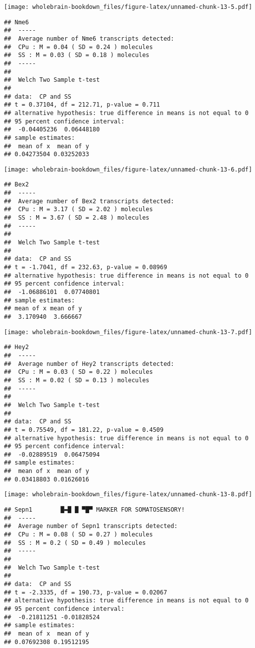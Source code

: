 \documentclass[]{book}
\theoremstyle{definition}
\theoremstyle{definition}
\theoremstyle{remark}
\begin{document}
\texttt{[image: wholebrain-bookdown\_files/figure-latex/unnamed-chunk-13-5.pdf]}

\begin{verbatim}
## Nme6
##  -----
##  Average number of Nme6 transcripts detected:
##  CPu : M = 0.04 ( SD = 0.24 ) molecules 
##  SS : M = 0.03 ( SD = 0.18 ) molecules
##  -----
## 
##  Welch Two Sample t-test
## 
## data:  CP and SS
## t = 0.37104, df = 212.71, p-value = 0.711
## alternative hypothesis: true difference in means is not equal to 0
## 95 percent confidence interval:
##  -0.04405236  0.06448180
## sample estimates:
##  mean of x  mean of y 
## 0.04273504 0.03252033
\end{verbatim}

\texttt{[image: wholebrain-bookdown\_files/figure-latex/unnamed-chunk-13-6.pdf]}

\begin{verbatim}
## Bex2
##  -----
##  Average number of Bex2 transcripts detected:
##  CPu : M = 3.17 ( SD = 2.02 ) molecules 
##  SS : M = 3.67 ( SD = 2.48 ) molecules
##  -----
## 
##  Welch Two Sample t-test
## 
## data:  CP and SS
## t = -1.7041, df = 232.63, p-value = 0.08969
## alternative hypothesis: true difference in means is not equal to 0
## 95 percent confidence interval:
##  -1.06886101  0.07740801
## sample estimates:
## mean of x mean of y 
##  3.170940  3.666667
\end{verbatim}

\texttt{[image: wholebrain-bookdown\_files/figure-latex/unnamed-chunk-13-7.pdf]}

\begin{verbatim}
## Hey2
##  -----
##  Average number of Hey2 transcripts detected:
##  CPu : M = 0.03 ( SD = 0.22 ) molecules 
##  SS : M = 0.02 ( SD = 0.13 ) molecules
##  -----
## 
##  Welch Two Sample t-test
## 
## data:  CP and SS
## t = 0.75549, df = 181.22, p-value = 0.4509
## alternative hypothesis: true difference in means is not equal to 0
## 95 percent confidence interval:
##  -0.02889519  0.06475094
## sample estimates:
##  mean of x  mean of y 
## 0.03418803 0.01626016
\end{verbatim}

\texttt{[image: wholebrain-bookdown\_files/figure-latex/unnamed-chunk-13-8.pdf]}

\begin{verbatim}
## Sepn1        █▬█ █ ▀█▀ MARKER FOR SOMATOSENSORY!
##  -----
##  Average number of Sepn1 transcripts detected:
##  CPu : M = 0.08 ( SD = 0.27 ) molecules 
##  SS : M = 0.2 ( SD = 0.49 ) molecules
##  -----
## 
##  Welch Two Sample t-test
## 
## data:  CP and SS
## t = -2.3335, df = 190.73, p-value = 0.02067
## alternative hypothesis: true difference in means is not equal to 0
## 95 percent confidence interval:
##  -0.21811251 -0.01828524
## sample estimates:
##  mean of x  mean of y 
## 0.07692308 0.19512195
\end{verbatim}
\end{document}
